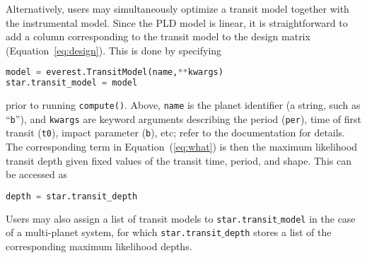 \documentclass[]{emulateapj}
\newenvironment{edits}{\color{red}}{\color{black}}
\begin{document}
\begin{edits}
Alternatively, users may simultaneously optimize a transit model together
with the instrumental model. Since the PLD model is linear, it is straightforward
to add a column corresponding to the transit model to the design matrix
(Equation~\ref{eq:design}). This is done by specifying
%
\begin{lstlisting}[language=Python]
model = everest.TransitModel(name,**kwargs)
star.transit_model = model
\end{lstlisting}
%
prior to running \texttt{compute()}. Above, \texttt{name} is the
planet identifier (a string, such as ``\texttt{b}''),
and \texttt{kwargs} are keyword arguments describing the
period (\texttt{per}), time of first transit (\texttt{t0}),
impact parameter (\texttt{b}), etc; refer to the documentation for details.
%
The corresponding term in Equation~(\ref{eq:what}) is then
the maximum likelihood transit depth given fixed values of the transit time,
period, and shape. This can be accessed as
%
\begin{lstlisting}[language=Python]
depth = star.transit_depth
\end{lstlisting}
%
Users may also assign a list of transit models to \texttt{star.transit$\_$model} in
the case of a multi-planet system, for which \texttt{star.transit$\_$depth} stores
a list of the corresponding maximum likelihood depths.


\end{edits}
\end{document}
